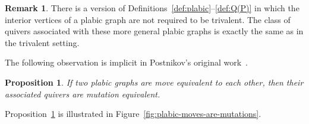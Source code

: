 \documentclass[10pt]{amsart}
\newtheorem{proposition}[theorem]{Proposition}
\theoremstyle{definition}
\newtheorem{remark}[theorem]{Remark}
\begin{document}
\begin{remark}
There is a version of Definitions~\ref{def:plabic}--\ref{def:Q(P)} 
in which the interior vertices of a plabic graph are not required to be trivalent. 
The class of quivers associated with these more general plabic graphs 
is exactly the same as in the trivalent setting. 
\end{remark}

The following observation is implicit in Postnikov's original work~\cite{postnikov}.

\begin{proposition} %
\label{pr:plabic-vs-quivers}
If two plabic graphs are move equivalent to each other, 
then their associated quivers are mutation equivalent. 
\end{proposition}

Proposition~\ref{pr:plabic-vs-quivers} is illustrated in 
Figure~\ref{fig:plabic-moves-are-mutations}. 


\end{document}
